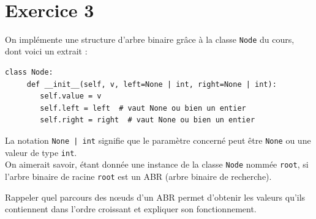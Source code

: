 \documentclass[a4paper,12pt,eval,firamath]{nsi}
\begin{document}
\\


\section*{Exercice 3 \small}

\resetquestion
On implémente une structure d'arbre binaire grâce à la classe \texttt{Node} du cours, dont voici un extrait :

\begin{pyc}
      \begin{verbatim}
class Node:
     def __init__(self, v, left=None | int, right=None | int):
        self.value = v
        self.left = left  # vaut None ou bien un entier
        self.right = right  # vaut None ou bien un entier
\end{verbatim}
\end{pyc}

La notation \texttt{None | int}  signifie que le paramètre concerné peut être \texttt{None} ou une valeur de type \texttt{int}.\\


On aimerait savoir, étant donnée une instance de la classe \texttt{Node} nommée \texttt{root}, si l'arbre binaire de racine \texttt{root} est un ABR (arbre binaire de recherche). 

\question Rappeler quel parcours des n\oe uds d'un ABR permet d'obtenir les valeurs qu'ils contiennent dans l'ordre croissant et expliquer son fonctionnement.
\end{document}
